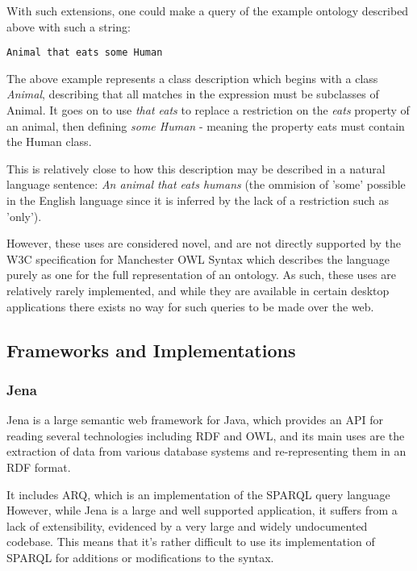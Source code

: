 \documentclass{article}
\begin{document}
With such extensions, one could make a query of the example ontology described
above with such a string:

\begin{lstlisting}
Animal that eats some Human
\end{lstlisting}

The above example represents a class description which begins with a class
\emph{Animal}, describing that all matches in the expression must be subclasses
of Animal. It goes on to use \emph{that eats} to replace a restriction on the
\emph{eats} property of an animal, then defining \emph{some Human} - meaning the
property eats must contain the Human class.

This is relatively close to how this description may be described in a natural
language sentence: \emph{An animal that eats humans} (the ommision of 'some'
possible in the English language since it is inferred by the lack of a
restriction such as 'only').

However, these uses are considered novel, and are not directly supported by the W3C
specification for Manchester OWL Syntax which describes the language purely as
one for the full representation of an ontology. As such, these uses are relatively rarely
implemented, and while they are available in certain desktop applications there
exists no way for such queries to be made over the web.

\subsection{Frameworks and Implementations} 

\subsubsection{Jena}

Jena is a large semantic web framework for Java, which provides an API for
reading several technologies including RDF and OWL, and its main uses are
the extraction of data from various database systems and re-representing them in
an RDF format. 

It includes ARQ, which is an implementation of the SPARQL query language
However, while Jena is a large and well supported application, it suffers 
from a lack of extensibility, evidenced by a very large and widely undocumented 
codebase. This means that it's rather difficult to use its implementation of
SPARQL for additions or modifications to the syntax.
\end{document}
